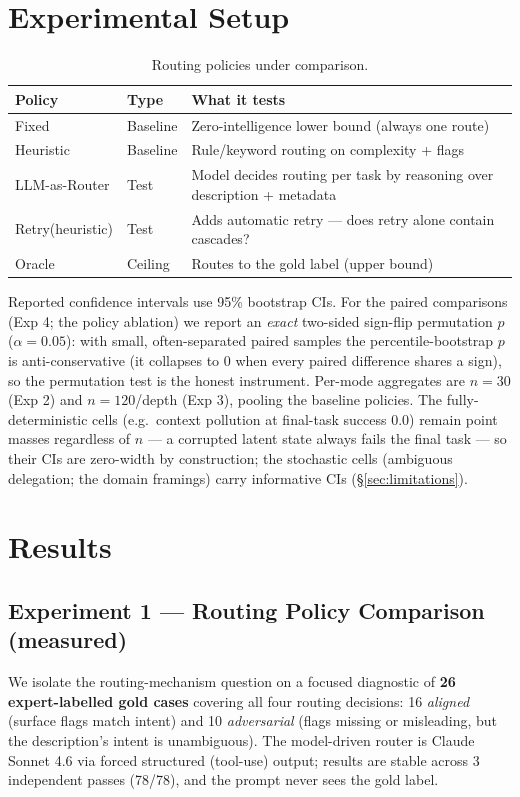 \documentclass[sigconf,nonacm,anonymous]{acmart}  %
\begin{document}
\section{Experimental Setup}
\label{sec:setup}
\begin{table}[t]
\centering
\caption{Routing policies under comparison.}
\label{tab:policies}
\small
\begin{tabular}{@{}llp{3.4cm}@{}}
\toprule
\textbf{Policy} & \textbf{Type} & \textbf{What it tests} \\
\midrule
Fixed & Baseline & Zero-intelligence lower bound (always one route) \\
Heuristic & Baseline & Rule/keyword routing on complexity + flags \\
LLM-as-Router & Test & Model decides routing per task by reasoning over
description + metadata \\
Retry(heuristic) & Test & Adds automatic retry --- does retry alone contain
cascades? \\
Oracle & Ceiling & Routes to the gold label (upper bound) \\
\bottomrule
\end{tabular}
\end{table}
Reported confidence intervals use 95\% bootstrap CIs. For the paired
comparisons (Exp 4; the policy ablation) we report an \emph{exact} two-sided
sign-flip permutation $p$ ($\alpha = 0.05$): with small, often-separated paired
samples the percentile-bootstrap $p$ is anti-conservative (it collapses to $0$
when every paired difference shares a sign), so the permutation test is the
honest instrument. Per-mode aggregates are $n{=}30$ (Exp 2) and $n{=}120$/depth
(Exp 3), pooling the baseline policies. The fully-deterministic cells (e.g.\
context pollution at final-task success 0.0) remain point masses regardless of
$n$ --- a corrupted latent state always fails the final task --- so their CIs are
zero-width by construction; the stochastic cells (ambiguous delegation; the
domain framings) carry informative CIs (\S\ref{sec:limitations}).

\section{Results}
\label{sec:results}
\subsection{Experiment 1 --- Routing Policy Comparison (measured)}
\label{sec:exp1}
We isolate the routing-mechanism question on a focused diagnostic of
\textbf{26 expert-labelled gold cases} covering all four routing decisions: 16
\emph{aligned} (surface flags match intent) and 10 \emph{adversarial} (flags
missing or misleading, but the description's intent is unambiguous). The
model-driven router is Claude Sonnet 4.6 via forced structured (tool-use) output;
results are stable across 3 independent passes (78/78), and the prompt never sees
the gold label.
\end{document}
